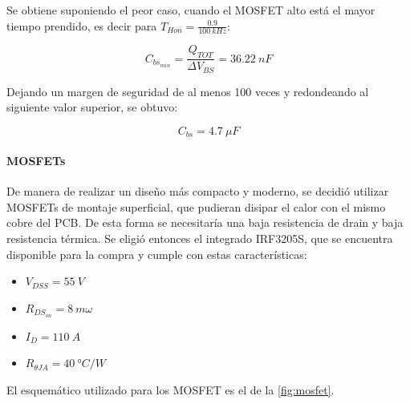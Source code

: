 \documentclass[titlepage, 12pt]{article}
\begin{document}
Se obtiene suponiendo el peor caso, cuando el MOSFET alto está el mayor tiempo prendido, es decir para $T_{Hon} = \frac{0.9}{\SI{100}{kHz}}$:

    \begin{equation}
        \label{eq:bootstrap-cmin}
        C_{bs_{min}} = \frac{Q_{TOT}}{\Delta V_{BS}} = \SI{36.22}{nF}
    \end{equation}

Dejando un margen de seguridad de al menos 100 veces y redondeando al siguiente valor superior, se obtuvo:

    \[
        C_{bs} = \SI{4.7}{\mu F}
    \]

\paragraph{MOSFETs}
De manera de realizar un diseño más compacto y moderno, se decidió utilizar MOSFETs de montaje superficial, que pudieran disipar el calor con el mismo cobre del PCB. De esta forma se necesitaría una baja resistencia de drain y baja resistencia térmica. Se eligió entonces el integrado IRF3205S, que se encuentra disponible para la compra y cumple con estas características:
    \begin{itemize}
        \item $V_{DSS} = \SI{55}{V}$
        \item $R_{DS_{on}} = \SI{8}{m\omega}$
        \item $I_D = \SI{110}{A}$
        \item $R_{\theta JA} = \SI{40}{\degree C/W}$
    \end{itemize}

El esquemático utilizado para los MOSFET es el de la \autoref{fig:mosfet}.
\end{document}
